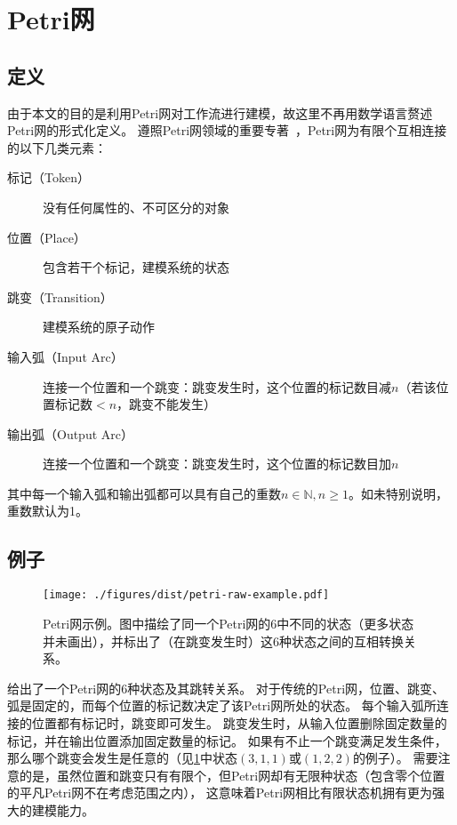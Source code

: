 \documentclass[index]{subfiles}
\begin{document}
\section{Petri网}
\subsection{定义}
由于本文的目的是利用Petri网对工作流进行建模，故这里不再用数学语言赘述Petri网的形式化定义。
遵照Petri网领域的重要专著~，Petri网为有限个互相连接的以下几类元素：
\begin{description}
  \item[标记（Token）] 没有任何属性的、不可区分的对象
  \item[位置（Place）] 包含若干个标记，建模系统的状态
  \item[跳变（Transition）] 建模系统的原子动作
  \item[输入弧（Input Arc）] 连接一个位置和一个跳变：跳变发生时，这个位置的标记数目减$n$（若该位置标记数$<n$，跳变不能发生）
  \item[输出弧（Output Arc）] 连接一个位置和一个跳变：跳变发生时，这个位置的标记数目加$n$
\end{description}
其中每一个输入弧和输出弧都可以具有自己的重数$n\in\mathbb{N}, n\geq1$。如未特别说明，重数默认为1。

\subsection{例子}
\begin{figure}[h]
  \centering
  \texttt{[image: ./figures/dist/petri-raw-example.pdf]}
  \caption{Petri网示例。图中描绘了同一个Petri网的6中不同的状态（更多状态并未画出），并标出了（在跳变发生时）这6种状态之间的互相转换关系。\label{fig:petri-raw}}
\end{figure}
给出了一个Petri网的6种状态及其跳转关系。
对于传统的Petri网，位置、跳变、弧是固定的，而每个位置的标记数决定了该Petri网所处的状态。
每个输入弧所连接的位置都有标记时，跳变即可发生。
跳变发生时，从输入位置删除固定数量的标记，并在输出位置添加固定数量的标记。
如果有不止一个跳变满足发生条件，那么哪个跳变会发生是任意的（见\cref{fig:petri-raw}中状态$(3,1,1)$或$(1,2,2)$的例子）。
需要注意的是，虽然位置和跳变只有有限个，但Petri网却有无限种状态（包含零个位置的平凡Petri网不在考虑范围之内），
这意味着Petri网相比有限状态机拥有更为强大的建模能力。
\end{document}
